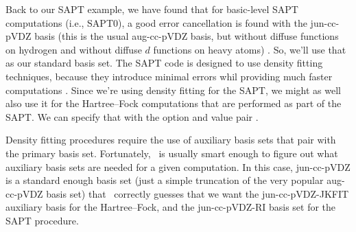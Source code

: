 Back to our SAPT example, we have found that for basic-level SAPT
computations (i.e., SAPT0), a good error cancellation is found
\cite{Hohenstein:2012:WIREs} with the jun-cc-pVDZ basis (this is the
usual aug-cc-pVDZ basis, but without diffuse functions on hydrogen and
without diffuse $d$ functions on heavy atoms) \cite{Papajak:2011:10}. So,
we'll use that as our standard basis set.  The SAPT code is designed to
use density fitting techniques, because they introduce minimal errors
whil providing much faster computations \cite{Hohenstein:2010:184111,
Hohenstein:2010:014101}. Since we're using density fitting for the SAPT,
we might as well also use it for the Hartree--Fock computations that are
performed as part of the SAPT.  We can specify that with the option
and value pair  .

Density fitting procedures require the use of auxiliary basis sets that
pair with the primary basis set.  Fortunately, \PSIfour\ is usually smart
enough to figure out what auxiliary basis sets are needed for a given
computation.  In this case, jun-cc-pVDZ is a standard enough basis set
(just a simple truncation of the very popular aug-cc-pVDZ basis set)
that \PSIfour\ correctly guesses that we want the jun-cc-pVDZ-JKFIT
auxiliary basis for the Hartree--Fock, and the jun-cc-pVDZ-RI basis set
for the SAPT procedure.

